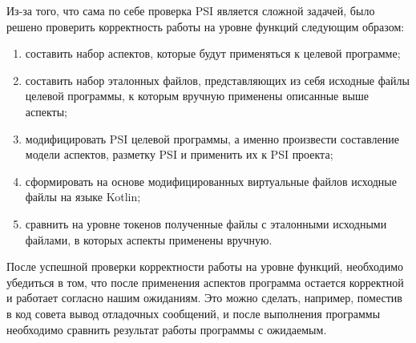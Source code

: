 \documentclass[conference]{IEEEtran}
\begin{document}

Из-за того, что сама по себе проверка PSI является сложной задачей, было решено
проверить корректность работы на уровне функций следующим образом:
\begin{enumerate}
    \item составить набор аспектов, которые будут применяться к целевой
          программе;
    \item составить набор эталонных файлов, представляющих из себя исходные
          файлы целевой программы, к которым вручную применены описанные выше
          аспекты;
	\item модифицировать PSI целевой программы, а именно произвести составление
	      модели аспектов, разметку PSI и применить их к PSI проекта;
	\item сформировать на основе  модифицированных виртуальные файлов исходные
	      файлы на языке Kotlin;
	\item сравнить на уровне токенов полученные файлы с эталонными исходными
	      файлами, в которых аспекты применены вручную.		  
\end{enumerate}



После успешной проверки корректности работы на уровне функций, необходимо
убедиться в том, что после применения аспектов программа остается корректной
и работает согласно нашим ожиданиям.
Это можно сделать, например, поместив в код совета вывод отладочных сообщений,
и после выполнения программы необходимо сравнить результат работы программы с 
ожидаемым.

\end{document}
